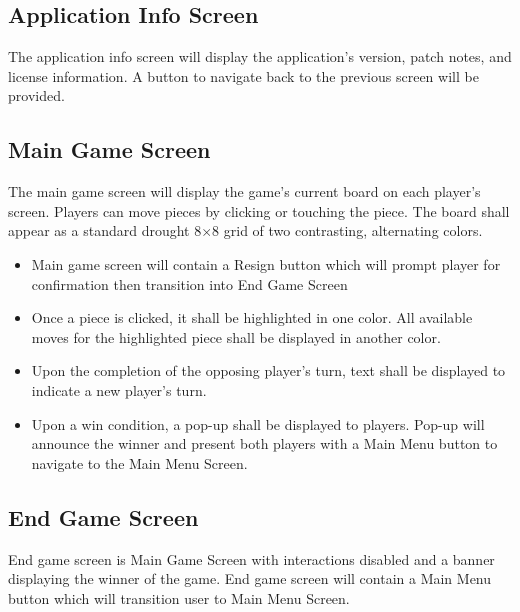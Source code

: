 \subsection{Application Info Screen}
The application info screen will display the application's version, patch
notes, and license information. A button to navigate back to the previous
screen will be provided.

\subsection{Main Game Screen}
The main game screen will display the game's current board on each player's
screen. Players can move pieces by clicking or touching the piece.  The board
shall appear as a standard drought 8$\times$8 grid of two contrasting,
alternating colors.
\begin{itemize}
  \item
    Main game screen will contain a Resign button which will prompt player for
    confirmation then transition into End Game Screen
  \item
    Once a piece is clicked, it shall be highlighted in one color.  All
    available moves for the highlighted piece shall be displayed in another
    color.
 \item
   Upon the completion of the opposing player's turn, text shall be displayed
   to indicate a new player's turn.
  \item
    Upon a win condition, a pop-up shall be displayed to players.  Pop-up will
    announce the winner and present both players with a Main Menu button to
    navigate to the Main Menu Screen.
\end{itemize}

\subsection{End Game Screen}
End game screen is Main Game Screen with interactions disabled and a banner
displaying the winner of the game.  End game screen will contain a Main Menu
button which will transition user to Main Menu Screen.
